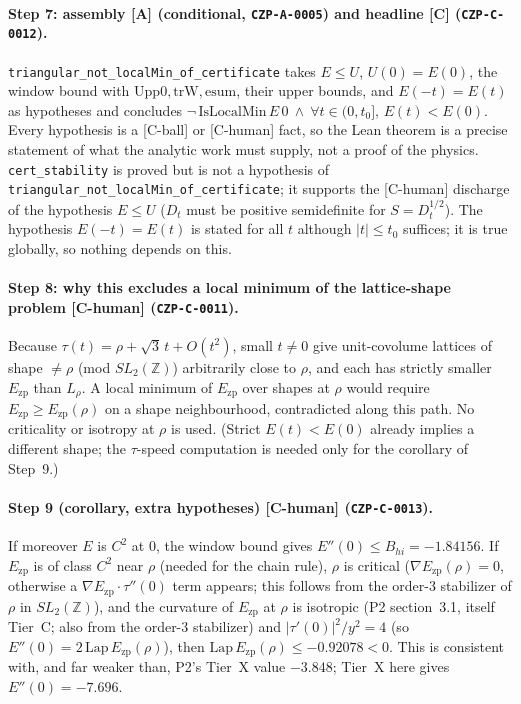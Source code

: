 \documentclass[10pt]{article}
\newcommand{\tier}[1]{\textsf{[#1]}}
\newcommand{\tA}{\tier{A}}
\newcommand{\tCh}{\tier{C-human}}
\newcommand{\tCb}{\textcolor{blue!60!black}{\textsf{[C-ball]}}}
\newcommand{\lean}[1]{\texttt{#1}}
\newcommand{\Ezp}{E_{\mathrm{zp}}}
\begin{document}
\paragraph{Step 7: assembly \tA{} (conditional, \texttt{CZP-A-0005}) and headline \tier{C} (\texttt{CZP-C-0012}).} \lean{triangular\_not\_localMin\_of\_certificate} takes $E\le U$, $U(0)=E(0)$, the window bound with $\mathrm{Upp0},\mathrm{trW},\mathrm{esum}$, their upper bounds, and $E(-t)=E(t)$ as hypotheses and concludes $\neg\,\mathrm{IsLocalMin}\,E\,0\ \wedge\ \forall t\in(0,t_0],\,E(t)<E(0)$. Every hypothesis is a \tCb{} or \tCh{} fact, so the Lean theorem is a precise statement of what the analytic work must supply, not a proof of the physics. \lean{cert\_stability} is proved but is not a hypothesis of \lean{triangular\_not\_localMin\_of\_certificate}; it supports the \tCh{} discharge of the hypothesis $E\le U$ ($D_t$ must be positive semidefinite for $S=D_t^{1/2}$). The hypothesis $E(-t)=E(t)$ is stated for all $t$ although $|t|\le t_0$ suffices; it is true globally, so nothing depends on this.

\paragraph{Step 8: why this excludes a local minimum of the lattice-shape problem \tCh{} (\texttt{CZP-C-0011}).} Because $\tau(t)=\rho+\sqrt3\,t+O(t^2)$, small $t\ne0$ give unit-covolume lattices of shape $\ne\rho$ (mod $SL_2(\mathbb Z)$) arbitrarily close to $\rho$, and each has strictly smaller $\Ezp$ than $L_\rho$. A local minimum of $\Ezp$ over shapes at $\rho$ would require $\Ezp\ge\Ezp(\rho)$ on a shape neighbourhood, contradicted along this path. No criticality or isotropy at $\rho$ is used. (Strict $E(t)<E(0)$ already implies a different shape; the $\tau$-speed computation is needed only for the corollary of Step~9.)

\paragraph{Step 9 (corollary, extra hypotheses) \tCh{} (\texttt{CZP-C-0013}).} If moreover $E$ is $C^2$ at $0$, the window bound gives $E''(0)\le B_{hi}=-1.84156$. If $\Ezp$ is of class $C^2$ near $\rho$ (needed for the chain rule), $\rho$ is critical ($\nabla\Ezp(\rho)=0$, otherwise a $\nabla\Ezp\cdot\tau''(0)$ term appears; this follows from the order-3 stabilizer of $\rho$ in $SL_2(\mathbb Z)$), and the curvature of $\Ezp$ at $\rho$ is isotropic (P2 section~3.1, itself Tier~C; also from the order-3 stabilizer) and $|\tau'(0)|^2/y^2=4$ (so $E''(0)=2\,\mathrm{Lap}\,\Ezp(\rho)$), then $\mathrm{Lap}\,\Ezp(\rho)\le-0.92078<0$. This is consistent with, and far weaker than, P2's Tier~X value $-3.848$; Tier~X here gives $E''(0)=-7.696$.
\end{document}
